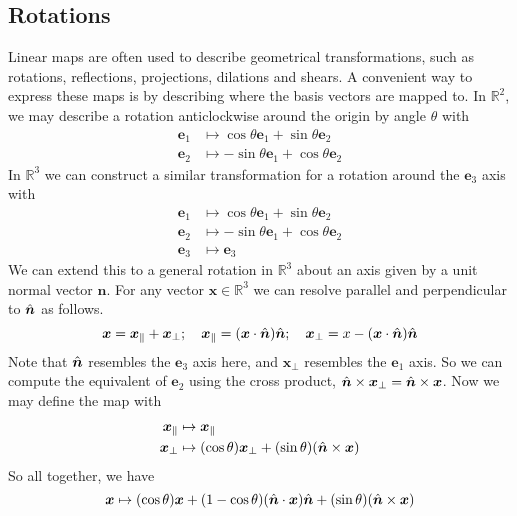 \documentclass{article}
\begin{document}
\subsection{Rotations}
Linear maps are often used to describe geometrical transformations, such as rotations, reflections, projections, dilations and shears. A convenient way to express these maps is by describing where the basis vectors are mapped to. In $\mathbb R^2$, we may describe a rotation anticlockwise around the origin by angle $\theta$ with
\begin{align*}
	\bm e_1 & \mapsto \cos \theta \bm e_1 + \sin \theta \bm e_2  \\
	\bm e_2 & \mapsto -\sin \theta \bm e_1 + \cos \theta \bm e_2
\end{align*}
In $\mathbb R^3$ we can construct a similar transformation for a rotation around the $\bm e_3$ axis with
\begin{align*}
	\bm e_1 & \mapsto \cos \theta \bm e_1 + \sin \theta \bm e_2  \\
	\bm e_2 & \mapsto -\sin \theta \bm e_1 + \cos \theta \bm e_2 \\
	\bm e_3 & \mapsto \bm e_3
\end{align*}
We can extend this to a general rotation in $\mathbb R^3$ about an axis given by a unit normal vector $\hat {\bm n}$. For any vector $\bm x \in \mathbb R^3$ we can resolve parallel and perpendicular to $\hat{\bm n}$ as follows.
\[ \bm x = \bm x_\parallel + \bm x_\perp;\quad \bm x_\parallel = (\bm x \cdot \hat{\bm n}) \hat{\bm n};\quad \bm x_\perp = x - (\bm x \cdot \hat{\bm n}) \hat{\bm n} \]
Note that $\hat{\bm n}$ resembles the $\bm e_3$ axis here, and $\bm x_\perp$ resembles the $\bm e_1$ axis. So we can compute the equivalent of $\bm e_2$ using the cross product, $\hat{\bm n} \times \bm x_\perp = \hat{\bm n} \times \bm x$. Now we may define the map with
\begin{align*}
	\bm x_\parallel & \mapsto \bm x_\parallel                                               \\
	\bm x_\perp     & \mapsto (\cos \theta) \bm x_\perp + (\sin \theta)(\hat{\bm n} \times \bm x)
\end{align*}
So all together, we have
\[ \bm x \mapsto (\cos \theta) \bm x + (1 - \cos \theta) (\hat{\bm n} \cdot \bm x)\hat{\bm n} + (\sin \theta)(\hat{\bm n} \times \bm x) \]
\end{document}
